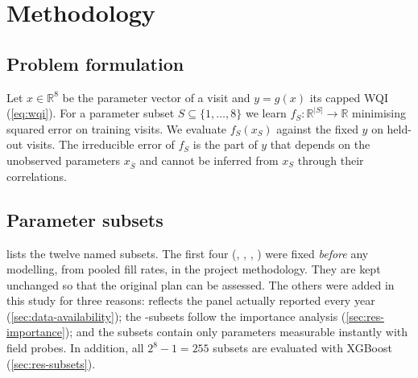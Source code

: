 \section{Methodology}
\label{sec:methods}

\subsection{Problem formulation}

Let $x\in\mathbb{R}^8$ be the parameter vector of a visit and $y=g(x)$ its capped WQI (\cref{eq:wqi}). For a parameter subset $S\subseteq\{1,\dots,8\}$ we learn $f_S:\mathbb{R}^{|S|}\to\mathbb{R}$ minimising squared error on training visits. We evaluate $f_S(x_S)$ against the fixed $y$ on held-out visits. The irreducible error of $f_S$ is the part of $y$ that depends on the unobserved parameters $x_{\bar S}$ and cannot be inferred from $x_S$ through their correlations.

\subsection{Parameter subsets}
\label{sec:methods-subsets}

 lists the twelve named subsets. The first four (, , , ) were fixed \emph{before} any modelling, from pooled fill rates, in the project methodology. They are kept unchanged so that the original plan can be assessed. The others were added in this study for three reasons:  reflects the panel actually reported every year (\cref{sec:data-availability}); the -subsets follow the importance analysis (\cref{sec:res-importance}); and the  subsets contain only parameters measurable instantly with field probes. In addition, all $2^8-1=255$ subsets are evaluated with XGBoost (\cref{sec:res-subsets}).

